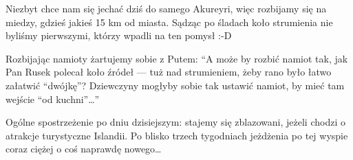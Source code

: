 Niezbyt chce nam się jechać dziś do samego Akureyri, więc rozbijamy się na miedzy, gdzieś jakieś 15 km od miasta. Sądząc po śladach koło strumienia nie byliśmy pierwszymi, którzy wpadli na ten pomysł :-D

Rozbijając namioty żartujemy sobie z Putem: “A może by rozbić namiot tak, jak Pan Rusek polecał koło źródeł --- tuż nad strumieniem, żeby rano było łatwo załatwić “dwójkę”? Dziewczyny mogłyby sobie tak ustawić namiot, by mieć tam wejście “od kuchni”…”


Ogólne spostrzeżenie po dniu dzisiejszym: stajemy się zblazowani, jeżeli chodzi o atrakcje turystyczne Islandii. Po blisko trzech tygodniach jeżdżenia po tej wyspie coraz ciężej o coś naprawdę nowego…
